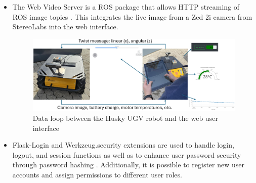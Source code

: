 \documentclass[conference]{IEEEtran}
\begin{document}
\begin{itemize}
\item The Web Video Server is a ROS package that allows HTTP streaming of ROS image topics \cite{webvideoserver}. This integrates the live image from a Zed 2i camera from StereoLabs \cite{zed} into the web interface.
\begin{figure}[t]
    \centerline{\includegraphics[width=18.2cm]{Pictures/loop.png}}
    \caption{Data loop between the Husky UGV robot and the web user interface}
    \label{fig:loop}
\end{figure}
\item Flask-Login and Werkzeug.security extensions are used to handle login, logout, and session functions as well as to enhance user password security through password hashing \cite{flasklogin, werkzeug}. Additionally, it is possible to register new user accounts and assign permissions to different user roles. 
\end{itemize}
\end{document}
